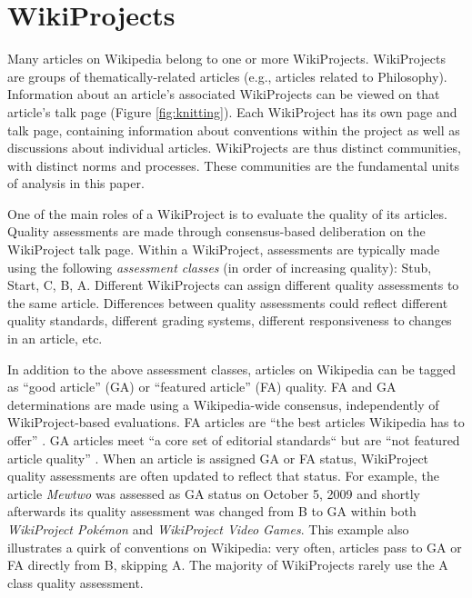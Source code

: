\section{WikiProjects}
\label{sec:wp}

Many articles on Wikipedia belong to one or more WikiProjects.
WikiProjects are groups of thematically-related articles
(e.g., articles related to Philosophy).
Information about an article's associated WikiProjects
can be viewed on that
article's talk page (Figure \ref{fig:knitting}).
Each WikiProject has its own page and talk page,
containing information about conventions within the project
as well as discussions about individual articles.
WikiProjects are thus distinct communities, with distinct norms and processes.
These communities are the fundamental units of analysis in this paper.

One of the main roles of a WikiProject is to evaluate the quality of its articles.
Quality assessments are made through consensus-based deliberation on the WikiProject
talk page.
Within a WikiProject,
assessments are typically made using the following {\em assessment classes}
(in order of increasing quality):
Stub, Start, C, B, A.
Different WikiProjects can assign different quality assessments to the same
article.
Differences between quality assessments could reflect different quality standards,
different grading systems, different responsiveness to changes in an article, etc.

In addition to the above assessment classes, articles on Wikipedia can be tagged as
``good article'' (GA) or ``featured article'' (FA) quality.
FA and GA determinations are made using a Wikipedia-wide consensus,
independently of WikiProject-based evaluations.
FA articles are ``the best articles Wikipedia has to offer''
\cite{wikipedia_contributors_wikipedia:featured_2018}.
GA articles meet ``a core set of editorial standards`` but are ``not featured article quality''
\cite{wikipedia_contributors_wikipedia:good_2017}.
When an article is assigned GA or FA status,
WikiProject quality assessments are often updated to reflect that status.
For example, the article {\em Mewtwo} was assessed as GA status on October 5,
2009 and shortly afterwards
its quality assessment was changed from B to GA within both
{\em WikiProject Pok\'emon} and
{\em WikiProject Video Games}.
This example also illustrates a quirk of conventions on Wikipedia:
very often, articles pass to GA or FA directly from B, skipping A.
The majority of WikiProjects rarely use the A class quality assessment.

